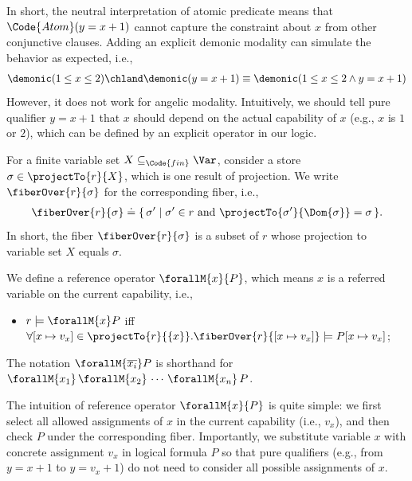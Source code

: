 \begin{definition}
In short, the neutral interpretation of atomic predicate means that $\Code{Atom}(y = x + 1)$ cannot capture the constraint about $x$ from other conjunctive clauses. Adding an explicit demonic modality can simulate the behavior as expected, i.e.,
\begin{align*}
  \demonic (1 \leq x \leq 2) \chland \demonic (y = x + 1) \equiv \demonic (1 \leq x \leq 2 \land y = x + 1) 
\end{align*}\noindent
However, it does not work for angelic modality. Intuitively, we should tell pure qualifier $y = x + 1$ that $x$ should depend on the actual capability of $x$ (e.g., $x$ is $1$ or $2$), which can be defined by an explicit operator in our logic.

\begin{definition}[Fibers]\label{def:fibers}
  For a finite variable set $X \subseteq_{\Code{fin}} \Var$, consider a store $\sigma \in \projectTo{r}{X}$, which is one result of projection. We write $\fiberOver{r}{\sigma}$ for the corresponding fiber, i.e.,
  \begin{align*}
    \fiberOver{r}{\sigma} \doteq \{\, \sigma' \mid \sigma' \in r \text{ and } \projectTo{\sigma'}{\Dom{\sigma}} = \sigma \,\}.
  \end{align*}\noindent
  In short, the fiber $\fiberOver{r}{\sigma}$ is a subset of $r$ whose projection to variable set $X$ equals $\sigma$.
\end{definition}

\begin{definition}\label{def:context-logic-reference-operator} We define a reference operator $\forallM{x}{P}$, which means $x$ is a referred variable on the current capability, i.e.,
  \begin{itemize}
    \item $r \models \forallM{x}P$ iff $\forall [x\mapsto v_x] \in \projectTo{r}{\{x\}}. \fiberOver{r}{[x\mapsto v_x]} \models P[x\mapsto v_x]$;
  \end{itemize}
The notation $\forallM{\overline{x_i}} P$ is shorthand for
  $\forallM{x_1}\,\forallM{x_2}\,\cdots\,\forallM{x_n}\,P$.
\end{definition}

The intuition of reference operator $\forallM{x}{P}$ is quite simple: we first select all allowed assignments of $x$ in the current capability (i.e., $v_x$), and then check $P$ under the corresponding fiber. Importantly, we substitute variable $x$ with concrete assignment $v_x$ in logical formula $P$ so that pure qualifiers (e.g., from $y = x + 1$ to $y = v_x + 1$) do not need to consider all possible assignments of $x$.


\end{definition}
